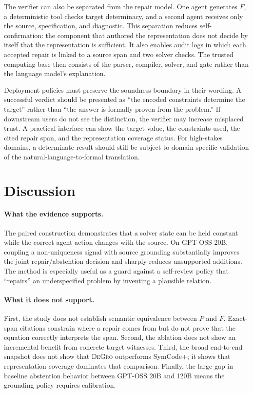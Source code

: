 \documentclass[sigconf,anonymous]{aamas}
\newcommand{\method}{\textsc{DeGro}}
\begin{document}
The verifier can also be separated from the repair model.  One agent generates $F$, a deterministic tool checks target determinacy, and a second agent receives only the source, specification, and diagnostic.  This separation reduces self-confirmation: the component that authored the representation does not decide by itself that the representation is sufficient.  It also enables audit logs in which each accepted repair is linked to a source span and two solver checks.  The trusted computing base then consists of the parser, compiler, solver, and gate rather than the language model's explanation.

Deployment policies must preserve the soundness boundary in their wording.  A successful verdict should be presented as ``the encoded constraints determine the target'' rather than ``the answer is formally proven from the problem.''  If downstream users do not see the distinction, the verifier may increase misplaced trust.  A practical interface can show the target value, the constraints used, the cited repair span, and the representation coverage status.  For high-stakes domains, a determinate result should still be subject to domain-specific validation of the natural-language-to-formal translation.

\section{Discussion}
\paragraph{What the evidence supports.}
The paired construction demonstrates that a solver state can be held constant while the correct agent action changes with the source.  On GPT-OSS 20B, coupling a non-uniqueness signal with source grounding substantially improves the joint repair/abstention decision and sharply reduces unsupported additions.  The method is especially useful as a guard against a self-review policy that ``repairs'' an underspecified problem by inventing a plausible relation.

\paragraph{What it does not support.}
First, the study does not establish semantic equivalence between $P$ and $F$.  Exact-span citations constrain where a repair comes from but do not prove that the equation correctly interprets the span.  Second, the ablation does not show an incremental benefit from concrete target witnesses.  Third, the broad end-to-end snapshot does not show that \method{} outperforms SymCode+; it shows that representation coverage dominates that comparison.  Finally, the large gap in baseline abstention behavior between GPT-OSS 20B and 120B means the grounding policy requires calibration.
\end{document}
